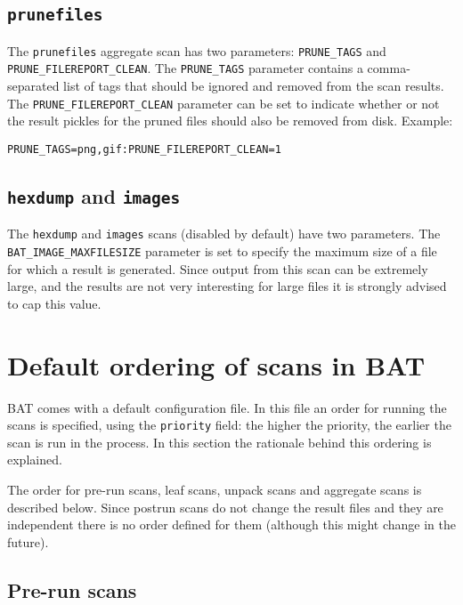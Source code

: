 \documentclass[10pt,a4paper]{article}
\begin{document}
\subsection{\texttt{prunefiles}}

The \texttt{prunefiles} aggregate scan has two parameters: \texttt{PRUNE\_TAGS}
and \texttt{PRUNE\_FILEREPORT\_CLEAN}. The \texttt{PRUNE\_TAGS} parameter
contains a comma-separated list of tags that should be ignored and removed from
the scan results. The \texttt{PRUNE\_FILEREPORT\_CLEAN} parameter can be set to
indicate whether or not the result pickles for the pruned files should also be
removed from disk. Example:

\begin{verbatim}
PRUNE_TAGS=png,gif:PRUNE_FILEREPORT_CLEAN=1
\end{verbatim}

\subsection{\texttt{hexdump} and \texttt{images}}

The \texttt{hexdump} and \texttt{images} scans (disabled by default) have two
parameters. The \texttt{BAT\_IMAGE\_MAXFILESIZE} parameter is set to specify
the maximum size of a file for which a result is generated. Since output from
this scan can be extremely large, and the results are not very interesting for
large files it is strongly advised to cap this value.

\section{Default ordering of scans in BAT}

BAT comes with a default configuration file. In this file an order for running
the scans is specified, using the \texttt{priority} field: the higher the
priority, the earlier the scan is run in the process. In this section the
rationale behind this ordering is explained.

The order for pre-run scans, leaf scans, unpack scans and aggregate scans is
described below. Since postrun scans do not change the result files and they are
independent there is no order defined for them (although this might change in
the future).

\subsection{Pre-run scans}
\end{document}
